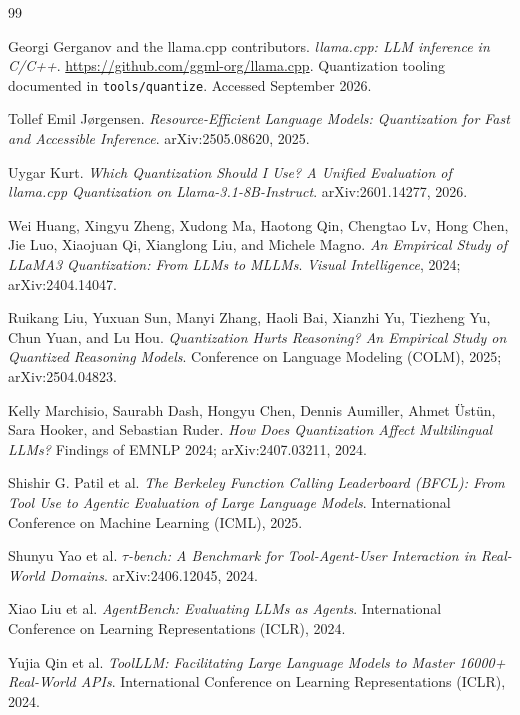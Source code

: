 \documentclass[11pt]{article}
\begin{document}
\FloatBarrier
\begin{thebibliography}{99}

Georgi Gerganov and the llama.cpp contributors.
\newblock \emph{llama.cpp: LLM inference in C/C++}.
\newblock \url{https://github.com/ggml-org/llama.cpp}. Quantization tooling documented in \texttt{tools/quantize}. Accessed September 2026.

Tollef Emil Jørgensen.
\newblock \emph{Resource-Efficient Language Models: Quantization for Fast and Accessible Inference}.
\newblock arXiv:2505.08620, 2025.

Uygar Kurt.
\newblock \emph{Which Quantization Should I Use? A Unified Evaluation of llama.cpp Quantization on Llama-3.1-8B-Instruct}.
\newblock arXiv:2601.14277, 2026.

Wei Huang, Xingyu Zheng, Xudong Ma, Haotong Qin, Chengtao Lv, Hong Chen, Jie Luo, Xiaojuan Qi, Xianglong Liu, and Michele Magno.
\newblock \emph{An Empirical Study of LLaMA3 Quantization: From LLMs to MLLMs}.
\newblock \emph{Visual Intelligence}, 2024; arXiv:2404.14047.

Ruikang Liu, Yuxuan Sun, Manyi Zhang, Haoli Bai, Xianzhi Yu, Tiezheng Yu, Chun Yuan, and Lu Hou.
\newblock \emph{Quantization Hurts Reasoning? An Empirical Study on Quantized Reasoning Models}.
\newblock Conference on Language Modeling (COLM), 2025; arXiv:2504.04823.

Kelly Marchisio, Saurabh Dash, Hongyu Chen, Dennis Aumiller, Ahmet \"Ust\"un, Sara Hooker, and Sebastian Ruder.
\newblock \emph{How Does Quantization Affect Multilingual LLMs?}
\newblock Findings of EMNLP 2024; arXiv:2407.03211, 2024.

Shishir G. Patil et al.
\newblock \emph{The Berkeley Function Calling Leaderboard (BFCL): From Tool Use to Agentic Evaluation of Large Language Models}.
\newblock International Conference on Machine Learning (ICML), 2025.

Shunyu Yao et al.
\newblock \emph{$\tau$-bench: A Benchmark for Tool-Agent-User Interaction in Real-World Domains}.
\newblock arXiv:2406.12045, 2024.

Xiao Liu et al.
\newblock \emph{AgentBench: Evaluating LLMs as Agents}.
\newblock International Conference on Learning Representations (ICLR), 2024.

Yujia Qin et al.
\newblock \emph{ToolLLM: Facilitating Large Language Models to Master 16000+ Real-World APIs}.
\newblock International Conference on Learning Representations (ICLR), 2024.


\end{thebibliography}
\end{document}
